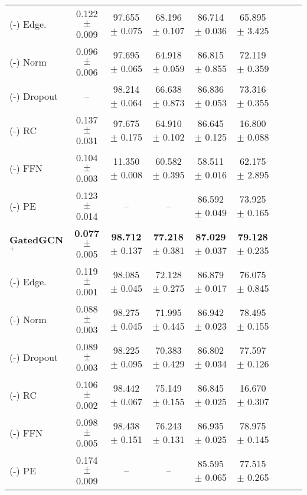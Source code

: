 \begin{table}[!h]
{\begin{tabular}{l|cccccccc}
         (-) Edge. & 0.122{\tiny{ $\pm$ 0.009}} & 97.655{\tiny{ $\pm$ 0.075}} & 68.196{\tiny{ $\pm$ 0.107}} & 86.714{\tiny{ $\pm$ 0.036}} & 65.895{\tiny{ $\pm$ 3.425 }} \\ 
        (-) Norm & 0.096{\tiny{ $\pm$ 0.006}} & 97.695{\tiny{ $\pm$ 0.065}} & 64.918{\tiny{ $\pm$ 0.059}} & 86.815{\tiny{ $\pm$ 0.855}} & 72.119{\tiny{ $\pm$ 0.359 }} \\ 
         (-) Dropout & – & 98.214{\tiny{ $\pm$ 0.064}} & 66.638{\tiny{ $\pm$ 0.873}} & 86.836{\tiny{ $\pm$ 0.053}} & 73.316{\tiny{ $\pm$ 0.355 }} \\ 
         (-) RC & 0.137{\tiny{ $\pm$ 0.031}} & 97.675{\tiny{ $\pm$ 0.175}} & 64.910{\tiny{ $\pm$ 0.102}} & 86.645{\tiny{ $\pm$ 0.125}} & 16.800{\tiny{ $\pm$ 0.088 }} \\ 
        (-) FFN & 0.104{\tiny{ $\pm$ 0.003}} & 11.350{\tiny{ $\pm$ 0.008}} & 60.582{\tiny{ $\pm$ 0.395}} & 58.511{\tiny{ $\pm$ 0.016}} & 62.175{\tiny{ $\pm$ 2.895 }} \\ 
        (-) PE & 0.123{\tiny{ $\pm$ 0.014}} & – & – & 86.592{\tiny{ $\pm$ 0.049}} & 73.925{\tiny{ $\pm$ 0.165 }} \\  
        \midrule %
        \textbf{GatedGCN$^+$} & \textbf{0.077}{\tiny{ $\pm$ 0.005}} & \textbf{98.712}{\tiny{ $\pm$ 0.137}} & \textbf{77.218}{\tiny{ $\pm$ 0.381}} & \textbf{87.029}{\tiny{ $\pm$ 0.037}} & \textbf{79.128}{\tiny{ $\pm$ 0.235 }} \\ 
        (-) Edge. & 0.119{\tiny{ $\pm$ 0.001}} & 98.085{\tiny{ $\pm$ 0.045}} & 72.128{\tiny{ $\pm$ 0.275}} & 86.879{\tiny{ $\pm$ 0.017}} & 76.075{\tiny{ $\pm$ 0.845 }} \\
        (-) Norm & 0.088{\tiny{ $\pm$ 0.003}} & 98.275{\tiny{ $\pm$ 0.045}} & 71.995{\tiny{ $\pm$ 0.445}} & 86.942{\tiny{ $\pm$ 0.023}} & 78.495{\tiny{ $\pm$ 0.155 }} \\
        (-) Dropout & 0.089{\tiny{ $\pm$ 0.003}} & 98.225{\tiny{ $\pm$ 0.095}} & 70.383{\tiny{ $\pm$ 0.429}} & 86.802{\tiny{ $\pm$ 0.034}} & 77.597{\tiny{ $\pm$ 0.126 }} \\
        (-) RC & 0.106{\tiny{ $\pm$ 0.002}} & 98.442{\tiny{ $\pm$ 0.067}} & 75.149{\tiny{ $\pm$ 0.155}} & 86.845{\tiny{ $\pm$ 0.025}} & 16.670{\tiny{ $\pm$ 0.307 }} \\
        (-) FFN & 0.098{\tiny{ $\pm$ 0.005}} & 98.438{\tiny{ $\pm$ 0.151}} & 76.243{\tiny{ $\pm$ 0.131}} & 86.935{\tiny{ $\pm$ 0.025}} & 78.975{\tiny{ $\pm$ 0.145 }} \\
        (-) PE & 0.174{\tiny{ $\pm$ 0.009}} & – & – & 85.595{\tiny{ $\pm$ 0.065}} & 77.515{\tiny{ $\pm$ 0.265 }} \\
        \bottomrule
    \end{tabular}
    }
    \label{tab:ab1}
\vspace{-0.10 in}
\end{table}

